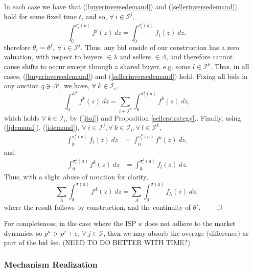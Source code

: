 \documentclass[sigconf, anonymous]{acmart}
\newcommand{\mcI}{\mathcal{I}}
\newcommand{\g}{\sigma}
\theoremstyle{definition}
\begin{document}
In each case we
have that (\ref{buyerinversedemand}) and (\ref{sellerinversedemand}) hold for
some fixed time $t$, and so, $\forall \ i \in\mcI^j$,
\begin{equation}\label{jdemand}
    \int_0^{\g_i^j(a)} f^j(z) \ dz 
    = \int_0^{\g_i^j(a)} f_i(z) \ dz,
\end{equation}
therefore $\theta_i = \theta^j, \ \forall \ i \in \mcI^j$.
Thus, any bid ouside of
our construction
has a zero valuation, with respect to buyers $\in\lambda$ and sellers
$\in\Lambda$, and therefore cannot cause shifts to occur except through a
shared buyer, e.g. some $l\in\mcI^k$. Thus, in all cases,
(\ref{buyerinversedemand}) and (\ref{sellerinversedemand}) hold. Fixing all
bids in any auction $q \ni \Lambda^j$,
we have, $\forall \ k\in\mcI_i$,
\begin{equation}\label{idemand}
    \displaystyle\int_0^{D^k} f^k(z) \ dz = \sum_{i\in\mcI^k}\int_0^{\g_i^k(a)}
f^k(z) \ dz,
\end{equation}
which holds $\forall \ k\in\mcI_i$, by (\ref{jtoi}) and Proposition
\ref{sellerstrategy}..
Finally, using (\ref{jdemand}), (\ref{idemand}), $\forall \ i\in\mcI^j, \forall \ k\in\mcI_i,\forall \ l\in\mcI^k$,
\begin{align}\label{tieqtk}
    \int_0^{\g_i^k(a)} f_i(z) \ dz &= \int_0^{\g_i^k(a)} f^k(z) \ dz,
\end{align}
and
\begin{align}\label{tkeqtl}
    \int_0^{\g_l^k(a)} f^k(z) \ dz &= \int_0^{\g_l^k(a)} f_l(z) \ dz.
\end{align}
Thus, with a slight abuse of notation for clarity,
\begin{equation}\label{funion-eq}
    \sum_{\lambda}\int_0^{\g(a)} f^\Lambda(z) \ dz =
\sum_{\Lambda}\int_0^{\g(a)} f_\lambda(z) \ dz,
\end{equation}
where the result follows by construction, and the continuity of $\theta'$.
$\qed$

For completeness, in the case where the ISP $\kappa$ 
does not adhere to the market dynamics, so $p^\kappa > p^j +
\epsilon, \ \forall \ j \in\mcI$, then we may absorb the overage (difference) as part of the
bid fee.
(NEED TO DO BETTER WITH TIME?)

\subsubsection{Mechanism Realization}
\end{document}
